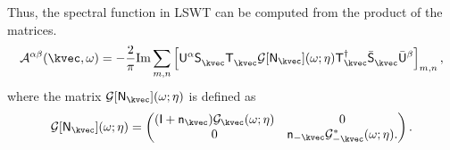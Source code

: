 Thus, the spectral function in LSWT can be computed from the product of the matrices.
\begin{equation}
    \mathcal{A}^{\alpha\beta}(\kvec, \omega) 
    = - \frac{2}{\pi} \mathrm{Im} 
    \sum_{m,n}
    \left[ 
    \mathsf{U}^{\alpha} \mathsf{S}_{\kvec}^{\phantom \dagger} \mathsf{T}_{\kvec}^{\phantom \dagger}
    \mathcal{G} [ \mathsf{N}_{\kvec} ] (\omega ; \eta)
    \mathsf{T}^{\dagger}_{\kvec} \bar{\mathsf{S}}_{\kvec}^{\phantom \dagger} \bar{\mathsf{U}}^{\beta}
    \right]_{m,n},
\end{equation}
where the matrix $\mathcal{G} [ \mathsf{N}_{\kvec} ] (\omega ; \eta)$ is defined as 
\begin{equation}
    \mathcal{G} [ \mathsf{N}_{\kvec} ] (\omega ; \eta)
    = 
    \begin{pmatrix}
        (\mathsf{I} + \mathsf{n}_{\kvec}) \mathcal{G}_{\kvec} (\omega; \eta) & 0 \\
        0 & \mathsf{n}_{-\kvec} \mathcal{G}_{-\kvec}^{*} (\omega; \eta).
    \end{pmatrix}.
\end{equation}





\newpage
